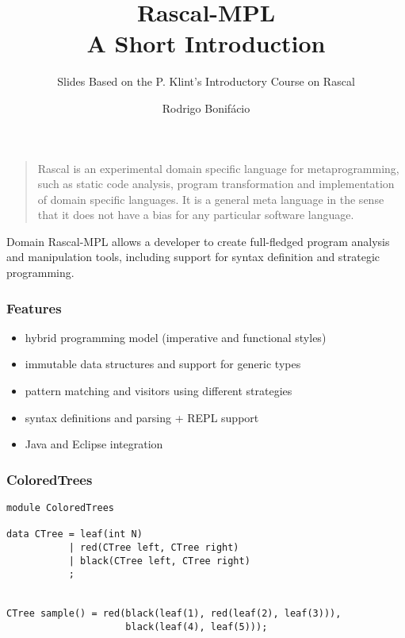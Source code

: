 \documentclass{beamer}
\title{Rascal-MPL \\ A Short Introduction}
\subtitle{Slides Based on the P. Klint's Introductory Course on Rascal}
\author{Rodrigo Bonif\'{a}cio}
\begin{document}
\begin{frame}
\titlepage
\end{frame}

\begin{frame}
  \begin{quote}
Rascal is an experimental domain specific language for metaprogramming, such as static code analysis, program transformation and implementation of domain specific languages. It is a general meta language in the sense that it does not have a bias for any particular software language.
  \end{quote}
\end{frame}

\begin{frame}
  \begin{block}{Domain}
    Rascal-MPL allows a developer
    to create full-fledged program
    analysis and manipulation tools,
    including support for syntax
    definition and strategic programming. 
  \end{block}
\end{frame}

\begin{frame}
  \frametitle{Features}

  \begin{itemize}
    \item hybrid programming model (imperative and functional styles)
    \item immutable data structures and support for generic types
    \item pattern matching and visitors using different strategies
    \item syntax definitions and parsing + REPL support  
    \item Java and Eclipse integration  
  \end{itemize}  
\end{frame}

\begin{frame}[fragile]
  \frametitle{ColoredTrees}

  \begin{small}
  \begin{verbatim}
module ColoredTrees

data CTree = leaf(int N)
           | red(CTree left, CTree right)
           | black(CTree left, CTree right)
           ;


CTree sample() = red(black(leaf(1), red(leaf(2), leaf(3))),
                     black(leaf(4), leaf(5))); 
\end{verbatim}
  \end{small}
\end{frame}
\end{document}
